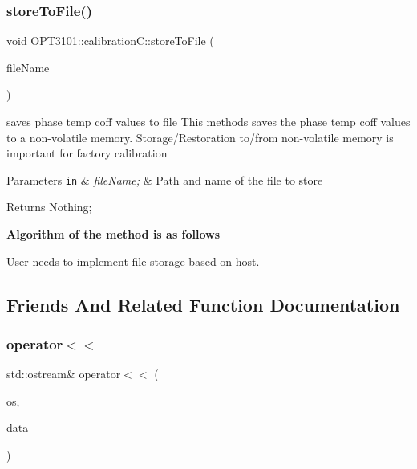 \subsubsection{\texorpdfstring{store\+To\+File()}{storeToFile()}}
{\footnotesize\ttfamily void O\+P\+T3101\+::calibration\+C\+::store\+To\+File (\begin{DoxyParamCaption}\item[{char $\ast$}]{file\+Name }\end{DoxyParamCaption})}



saves phase temp coff values to file This methods saves the phase temp coff values to a non-\/volatile memory. Storage/\+Restoration to/from non-\/volatile memory is important for factory calibration 


\begin{DoxyParams}[1]{Parameters}
\mbox{\tt in}  & {\em file\+Name;} & Path and name of the file to store \\
\hline
\end{DoxyParams}
\begin{DoxyReturn}{Returns}
Nothing; 
\end{DoxyReturn}
{\bfseries Algorithm of the method is as follows}


\begin{DoxyItemize}
\item User needs to implement file storage based on host. 
\end{DoxyItemize}

\subsection{Friends And Related Function Documentation}
\mbox{\label{class_o_p_t3101_1_1calibration_c_ad4bd440df02467a0bbb3f15f07a27e2b}} 
\subsubsection{\texorpdfstring{operator$<$$<$}{operator<<}}
{\footnotesize\ttfamily std\+::ostream\& operator$<$$<$ (\begin{DoxyParamCaption}\item[{std\+::ostream \&}]{os,  }\item[{const \mbox{\hyperlink{class_o_p_t3101_1_1calibration_c}{calibrationC}} $\ast$}]{data }\end{DoxyParamCaption})\hspace{0.3cm}{\ttfamily [friend]}}



